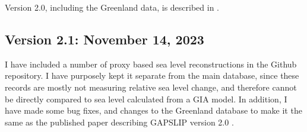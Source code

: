 Version 2.0, including the Greenland data, is described in \citet{Gowan2023}.

\subsection{Version 2.1: November 14, 2023}

I have included a number of proxy based sea level reconstructions in the Github repository. I have purposely kept it separate from the main database, since these records are mostly not measuring relative sea level change, and therefore cannot be directly compared to sea level calculated from a GIA model. In addition, I have made some bug fixes, and changes to the Greenland database to make it the same as the published paper describing GAPSLIP version 2.0 \citep{Gowan2023}.


